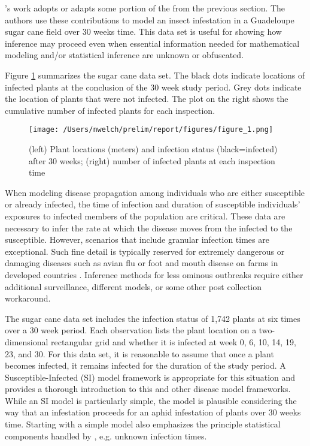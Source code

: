 \documentclass{uwstat572}
\begin{document}
\citet{Brown}'s work adopts or adapts some portion of the from the previous section.
The authors use these contributions to model an insect infestation in a Guadeloupe sugar cane field over 30 weeks time. 
This data set is useful for showing how inference may proceed even when essential information needed for mathematical modeling and/or statistical inference are unknown or obfuscated. 

Figure \ref{fig:data_plot} summarizes the sugar cane data set. 
The black dots indicate locations of infected plants at the conclusion of the 30 week study period. 
Grey dots indicate the location of plants that were not infected. 
The plot on the right shows the cumulative number of infected plants for each inspection.

\begin{figure}[H]
\centering
\texttt{[image: /Users/nwelch/prelim/report/figures/figure\_1.png]}
\caption{(left) Plant locations (meters) and infection status (black=infected) after 30 weeks; (right) number of infected plants at each inspection time}
\label{fig:data_plot}
\end{figure} 

When modeling disease propagation among individuals who are either susceptible or already infected, the time of infection and duration of susceptible individuals' exposures to infected members of the population are critical. 
These data are necessary to infer the rate at which the disease moves from the infected to the susceptible. 
However, scenarios that include granular infection times are exceptional. 
Such fine detail is typically reserved for extremely dangerous or damaging diseases such as avian flu or foot and mouth disease on farms in developed countries \citep{McKinley}. 
Inference methods for less ominous outbreaks require either additional surveillance, different models, or some other post collection workaround. 

The sugar cane data set includes the infection status of 1,742 plants at six times over a 30 week period. 
Each observation lists the plant location on a two-dimensional rectangular grid and whether it is infected at week 0, 6, 10, 14, 19, 23, and 30.
For this data set, it is reasonable to assume that once a plant becomes infected, it remains infected for the duration of the study period. 
A Susceptible-Infected (SI) model framework is appropriate for this situation and \citet{Jewell} provides a thorough introduction to this and other disease model frameworks. 
While an SI model is particularly simple, the model is plausible considering the way that an infestation proceeds for an aphid infestation of plants over 30 weeks time. 
Starting with a simple model also emphasizes the principle statistical components handled by \citet{Brown}, e.g. unknown infection times. 
\end{document}
